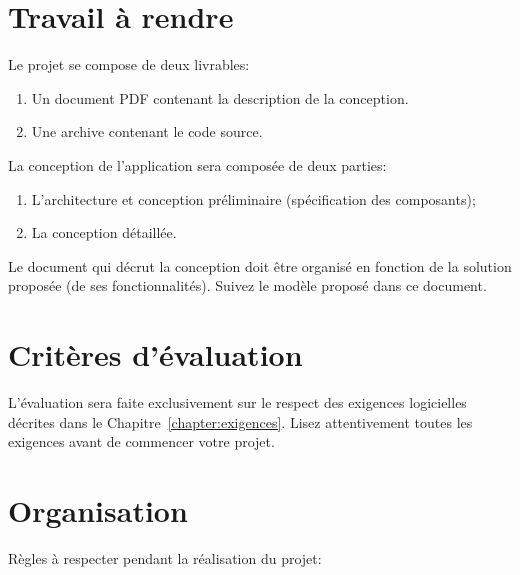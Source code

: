 \documentclass[a4]{report}
\begin{document}
\section{Travail à rendre}
Le projet se compose de deux livrables:
\begin{enumerate}
	\item Un document PDF contenant la description de la conception.
	\item Une archive contenant le code source.
\end{enumerate}

La conception de l'application sera composée de deux parties:
\begin{enumerate}
	\item L'architecture et conception préliminaire (spécification des composants);
	\item La conception détaillée.
\end{enumerate} 

Le document qui décrut la conception doit être organisé en fonction de la solution proposée (de ses fonctionnalités).
Suivez le modèle proposé dans ce document.


\section{Critères d'évaluation}

L'évaluation sera faite exclusivement sur le respect des exigences logicielles décrites dans le Chapitre~\ref{chapter:exigences}.
Lisez attentivement toutes les exigences avant de commencer votre projet.


\section{Organisation}

Règles à respecter pendant la réalisation du projet:
\end{document}
